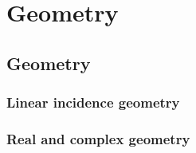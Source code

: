 \documentclass[a4paper,makeidx]{book}
\begin{document}
    \part{Geometry}

    \chapter{Geometry}

	\section{Linear incidence geometry}

	

    \section{Real and complex geometry}
    
	
	

	\printindex
\end{document}
